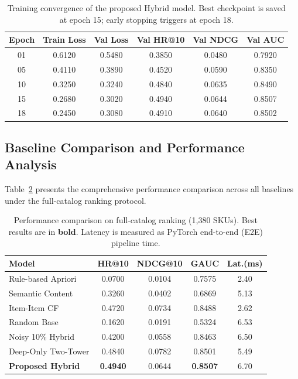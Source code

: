 \documentclass[10pt,conference]{IEEEtran}
\begin{document}
\begin{table}[t]
\centering
\caption{Training convergence of the proposed Hybrid model. Best checkpoint is saved at epoch 15; early stopping triggers at epoch 18.}
\label{tab:convergence}
\begin{tabular}{cccccc}
\toprule
\textbf{Epoch} & \textbf{Train Loss} & \textbf{Val Loss} & \textbf{Val HR@10} & \textbf{Val NDCG} & \textbf{Val AUC} \\
\midrule
01 & 0.6120 & 0.5480 & 0.3850 & 0.0480 & 0.7920 \\
05 & 0.4110 & 0.3890 & 0.4520 & 0.0590 & 0.8350 \\
10 & 0.3250 & 0.3240 & 0.4840 & 0.0635 & 0.8490 \\
15 & 0.2680 & 0.3020 & 0.4940 & 0.0644 & 0.8507 \\
18 & 0.2450 & 0.3080 & 0.4910 & 0.0640 & 0.8502 \\
\bottomrule
\end{tabular}
\end{table}

\subsection{Baseline Comparison and Performance Analysis}
\label{subsec:baseline_comparison}

Table~\ref{tab:main_results} presents the comprehensive performance comparison across all baselines under the full-catalog ranking protocol.

\begin{table}[t]
\centering
\caption{Performance comparison on full-catalog ranking (1,380 SKUs). Best results are in \textbf{bold}. Latency is measured as PyTorch end-to-end (E2E) pipeline time.}
\label{tab:main_results}
\begin{tabular}{lcccc}
\toprule
\textbf{Model} & \textbf{HR@10} & \textbf{NDCG@10} & \textbf{GAUC} & \textbf{Lat.(ms)} \\
\midrule
Rule-based Apriori      & 0.0700 & 0.0104 & 0.7575 & 2.40 \\
Semantic Content        & 0.3260 & 0.0402 & 0.6869 & 5.13 \\
Item-Item CF            & 0.4720 & 0.0734 & 0.8488 & 2.62 \\
Random Base             & 0.1620 & 0.0191 & 0.5324 & 6.53 \\
Noisy 10\% Hybrid      & 0.4200 & 0.0558 & 0.8463 & 6.50 \\
Deep-Only Two-Tower     & 0.4840 & 0.0782 & 0.8501 & 5.49 \\
\midrule
\textbf{Proposed Hybrid} & \textbf{0.4940} & 0.0644 & \textbf{0.8507} & 6.70 \\
\bottomrule
\end{tabular}
\end{table}
\end{document}
